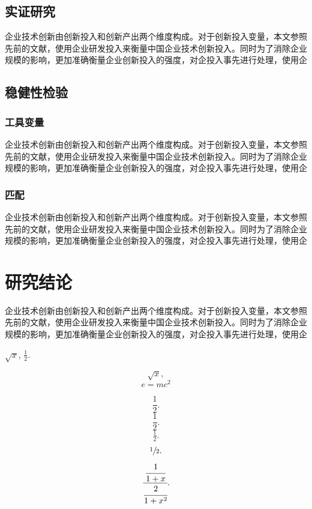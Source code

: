 \documentclass[UTF8]{ctexart} %
\begin{document}
\subsection{实证研究}
企业技术创新由创新投入和创新产出两个维度构成。对于创新投入变量，本文参照先前的文献，使用企业研发投入来衡量中国企业技术创新投入。同时为了消除企业规模的影响，更加准确衡量企业创新投入的强度，对企投入事先进行处理，使用企
\subsection{稳健性检验}
\subsubsection{工具变量}
企业技术创新由创新投入和创新产出两个维度构成。对于创新投入变量，本文参照先前的文献，使用企业研发投入来衡量中国企业技术创新投入。同时为了消除企业规模的影响，更加准确衡量企业创新投入的强度，对企投入事先进行处理，使用企
\subsubsection{匹配}
企业技术创新由创新投入和创新产出两个维度构成。对于创新投入变量，本文参照先前的文献，使用企业研发投入来衡量中国企业技术创新投入。同时为了消除企业规模的影响，更加准确衡量企业创新投入的强度，对企投入事先进行处理，使用企
\section{研究结论}
企业技术创新\cite{林炜企业创新激励}由创新投入和创新产出两个维度构成。对于创新投入变量，本文参照先前的文献，使用企业研发投入来衡量中国企业技\cite{田轩股权激励计划能促进企业创新吗}术创新投入。同时为了消除企业规模的影响，更加准确衡量企业创新投入的强度，对企投入事先进行处理，使用企




$\sqrt{x}$, \quad $\frac{1}{2}$. %

\[ \sqrt{x}, \] %
\begin{equation} %
e = mc^2
\end{equation}

\[ \frac{1}{2}. \]
\[ \dfrac{1}{2}. \]
\[ \tfrac{1}{2}. \]
\[ \sfrac{1}{2}. \] %
\[ \cfrac{\cfrac{1}{1+x}}{\cfrac{2}{1+x^2}}. \]
\end{document}

